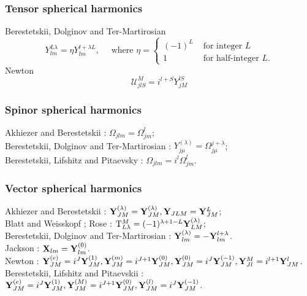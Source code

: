 \subsubsection{Tensor spherical harmonics}
Berestetskii, Dolginov and Ter-Martirosian \cite{ref055}
\[
Y_{l m}^{L \lambda}=\eta Y_{l m}^{l+\lambda L}, \quad \text { where } \eta= \begin{cases}(-1)^{L} & \text { for integer } L \\ 1 & \text { for half-integer } L .\end{cases}
\]
Newton \cite{ref028}
\[
\mathcal{U}_{j l S}^{M}=i^{l+S} Y_{j M}^{l S}
\]
\subsubsection{Spinor spherical harmonics}
Akhiezer and Berestetskii \cite{ref002}: $\Omega_{j l m}=\Omega_{j m}^{l}$;\\[0pt]
Berestetskii, Dolginov and Ter-Martirosian \cite{ref055}: $Y_{j \mu}^{(\lambda)}=\Omega_{j \mu}^{j+\lambda}$;\\[0pt]
Berestetskii, Lifshitz and Pitaevsky \cite{ref006}: $\Omega_{j l m}=i^{l} \Omega_{j m}^{l}$.

\subsubsection{Vector spherical harmonics}
Akhiezer and Berestetskii \cite{ref002}: $\mathbf{Y}_{J M}^{(\lambda)}=\mathbf{Y}_{J M}^{(\lambda)}, \mathbf{Y}_{J L M}=\mathbf{Y}_{J M}^{L}$;\\[0pt]
Blatt and Weisskopf \cite{ref007}; Rose \cite{ref030}: $\mathrm{T}_{L \lambda}^{M}=(-1)^{\lambda+1-L} \mathbf{Y}_{L M}^{(\lambda)}$;\\[0pt]
Berestetskii, Dolginov and Ter-Martirosian \cite{ref055}: $\mathbf{Y}_{l m}^{(\lambda)}=-\mathbf{Y}_{l m}^{l+\lambda}$.\\[0pt]
Jackson \cite{ref023}: $\mathbf{X}_{l m}=\mathbf{Y}_{l m}^{(0)}$.\\[0pt]
Newton \cite{ref028}: $\mathbf{Y}_{J M}^{(e)}=i^{J} \mathbf{Y}_{J M}^{(1)}, \mathbf{Y}_{J M}^{(m)}=i^{J+1} \mathbf{Y}_{J M}^{(0)}, \mathbf{Y}_{J M}^{(0)}=i^{J} \mathbf{Y}_{J M}^{(-1)}, \mathbf{Y}_{J l}^{M}=i^{l+1} \mathbf{Y}_{J M}^{l}$.\\[0pt]
Berestetskii, Lifshitz and Pitaevskii \cite{ref006}: $\mathbf{Y}_{J M}^{(e)}=i^{J} \mathbf{Y}_{J M}^{(1)}, \mathbf{Y}_{J M}^{(M)}=i^{J+1} \mathbf{Y}_{J M}^{(0)}, \mathbf{Y}_{J M}^{(l)}=i^{J} \mathbf{Y}_{J M}^{(-1)}$.
